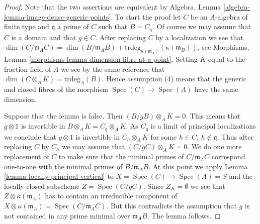 \documentclass[10pt,a4paper]{amsart}
\theoremstyle{plain}
\theoremstyle{definition}
\theoremstyle{remark}
\numberwithin{equation}{subsection}
\def\Spec{\mathop{\mathrm{Spec}}}
\begin{document}
\begin{proof}
Note that the two assertions are equivalent by
Algebra, Lemma \ref{algebra-lemma-image-dense-generic-points}.
To start the proof let $C$ be an $A$-algebra of finite type
and $\mathfrak q$ a prime of $C$ such that $B = C_{\mathfrak q}$.
Of course we may assume that $C$ is a domain and that $g \in C$.
After replacing $C$ by a localization we see that
$\dim(C/\mathfrak m_AC) = \dim(B/\mathfrak m_AB) +
\text{trdeg}_{\kappa(\mathfrak m_A)}(\kappa(\mathfrak m_B))$, see
Morphisms, Lemma \ref{morphisms-lemma-dimension-fibre-at-a-point}.
Setting $K$ equal to the fraction field of $A$
we see by the same reference that
$\dim(C \otimes_A K) = \text{trdeg}_A(B)$. Hence assumption
(4) means that the generic and closed fibres of the morphism
$\Spec(C) \to \Spec(A)$ have the same dimension.

\medskip\noindent
Suppose that the lemma is false. Then $(B/gB) \otimes_A K = 0$.
This means that $g \otimes 1$ is invertible in $B \otimes_A K
= C_{\mathfrak q} \otimes_A K$. As $C_{\mathfrak q}$ is a limit
of principal localizations we conclude that $g \otimes 1$
is invertible in $C_h \otimes_A K$ for some
$h \in C$, $h \not \in \mathfrak q$. Thus after replacing $C$
by $C_h$ we may assume that $(C/gC) \otimes_A K = 0$.
We do one more replacement of $C$ to make sure that the minimal
primes of $C/\mathfrak m_AC$ correspond one-to-one with the minimal
primes of $B/\mathfrak m_AB$. At this point we apply
Lemma \ref{lemma-locally-principal-vertical}
to $X = \Spec(C) \to \Spec(A) = S$ and the locally closed
subscheme $Z = \Spec(C/gC)$. Since $Z_K = \emptyset$ we see that
$Z \otimes \kappa(\mathfrak m_A)$ has to contain an irreducible
component of
$X \otimes \kappa(\mathfrak m_A) = \Spec(C/\mathfrak m_AC)$.
But this contradicts the assumption that $g$ is not contained
in any prime minimal over $\mathfrak m_AB$. The lemma follows.
\end{proof}
\end{document}
